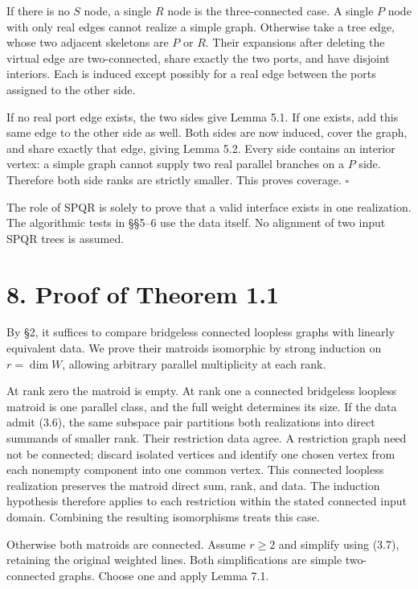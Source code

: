 \documentclass[11pt]{article}
\begin{document}
If there is no $S$ node, a single $R$ node is the three-connected case. A single $P$ node with only real edges cannot realize a simple graph. Otherwise take a tree edge, whose two adjacent skeletons are $P$ or $R$. Their expansions after deleting the virtual edge are two-connected, share exactly the two ports, and have disjoint interiors. Each is induced except possibly for a real edge between the ports assigned to the other side.

If no real port edge exists, the two sides give Lemma 5.1. If one exists, add this same edge to the other side as well. Both sides are now induced, cover the graph, and share exactly that edge, giving Lemma 5.2. Every side contains an interior vertex: a simple graph cannot supply two real parallel branches on a $P$ side. Therefore both side ranks are strictly smaller. This proves coverage. \ensuremath{\square}

The role of SPQR is solely to prove that a valid interface exists in one realization. The algorithmic tests in \S{}\S{}5--6 use the data itself. No alignment of two input SPQR trees is assumed.

\section*{8. Proof of Theorem 1.1}

By \S{}2, it suffices to compare bridgeless connected loopless graphs with linearly equivalent data. We prove their matroids isomorphic by strong induction on $r=\dim W$, allowing arbitrary parallel multiplicity at each rank.

At rank zero the matroid is empty. At rank one a connected bridgeless loopless matroid is one parallel class, and the full weight determines its size. If the data admit (3.6), the same subspace pair partitions both realizations into direct summands of smaller rank. Their restriction data agree. A restriction graph need not be connected; discard isolated vertices and identify one chosen vertex from each nonempty component into one common vertex. This connected loopless realization preserves the matroid direct sum, rank, and data. The induction hypothesis therefore applies to each restriction within the stated connected input domain. Combining the resulting isomorphisms treats this case.

Otherwise both matroids are connected. Assume $r\ge2$ and simplify using (3.7), retaining the original weighted lines. Both simplifications are simple two-connected graphs. Choose one and apply Lemma 7.1.
\end{document}
